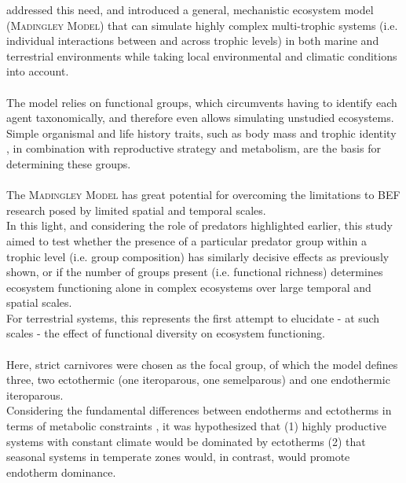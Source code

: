 \cite{Harfoot2014} addressed this need, and introduced a general, mechanistic ecosystem model (\textsc{Madingley Model}) that can simulate highly complex multi-trophic systems (i.e. individual interactions between and across trophic levels) in both marine and terrestrial environments while taking local environmental and climatic conditions into account. \\\\
The model relies on functional groups, which circumvents having to identify each agent taxonomically, and therefore even allows simulating unstudied ecosystems. 
Simple organismal and life history traits, such as body mass and trophic identity  \citep[][shown to be adequate for explaining BEF relationships]{Berlow2009,Wood2010,Saguin2014,Legagneux2014}, in combination with reproductive strategy and metabolism, are the basis for determining these groups.
\\\\
The \textsc{Madingley Model} has great potential for overcoming the limitations to BEF research posed by limited spatial and temporal scales. \\
In this light, and considering the role of predators highlighted earlier, this study aimed to test whether the presence of a particular predator group within a trophic level (i.e. group composition) has similarly decisive effects as previously shown, or if the number of groups present (i.e. functional richness) determines ecosystem functioning alone in complex ecosystems over large temporal and spatial scales. \\ 
For terrestrial systems, this represents the first attempt to elucidate - at such scales - the effect of functional diversity on ecosystem functioning.
\\\\
Here, strict carnivores were chosen as the focal group, of which the model defines three, two ectothermic (one iteroparous, one semelparous) and one endothermic iteroparous. 
\\
Considering the fundamental differences between endotherms and ectotherms in terms of metabolic constraints \citep{Nagy2005}, it was hypothesized that (1) highly productive systems with constant climate would be dominated by ectotherms (2) that seasonal systems in temperate zones would, in contrast, would promote endotherm dominance.


